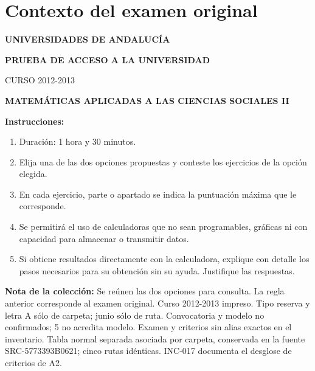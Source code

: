 \section*{Contexto del examen original}
\textbf{UNIVERSIDADES DE ANDALUCÍA}\par
\textbf{PRUEBA DE ACCESO A LA UNIVERSIDAD}\par
CURSO 2012-2013\par
\textbf{MATEMÁTICAS APLICADAS A LAS CIENCIAS SOCIALES II}

\textbf{Instrucciones:}
\begin{enumerate}[label=\textbf{\alph*)}]
  \item Duración: 1 hora y 30 minutos.
  \item Elija una de las dos opciones propuestas y conteste los ejercicios de la opción elegida.
  \item En cada ejercicio, parte o apartado se indica la puntuación máxima que le corresponde.
  \item Se permitirá el uso de calculadoras que no sean programables, gráficas ni con capacidad para almacenar o transmitir datos.
  \item Si obtiene resultados directamente con la calculadora, explique con detalle los pasos necesarios para su obtención sin su ayuda. Justifique las respuestas.
\end{enumerate}
\noindent\textbf{Nota de la colección:} Se reúnen las dos opciones para consulta. La regla anterior corresponde al examen original. Curso 2012-2013 impreso. Tipo reserva y letra A sólo de carpeta; junio sólo de ruta. Convocatoria y modelo no confirmados; 5 no acredita modelo. Examen y criterios sin alias exactos en el inventario. Tabla normal separada asociada por carpeta, conservada en la fuente SRC-5773393B0621; cinco rutas idénticas. INC-017 documenta el desglose de criterios de A2.
\par\medskip
